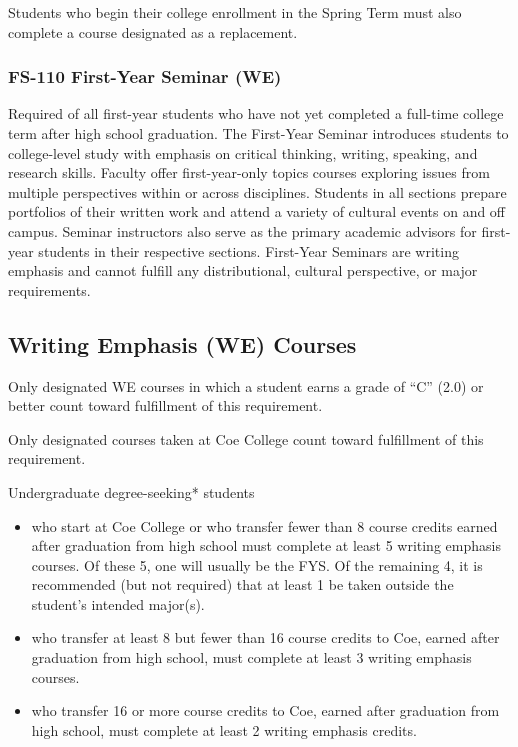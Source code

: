 \documentclass[
  letterpaper,
]{scrbook}
\providecommand{\tightlist}{%
  \setlength{\itemsep}{0pt}\setlength{\parskip}{0pt}}
\begin{document}
Students who begin their college enrollment in the Spring Term must also
complete a course designated as a replacement.

\subsubsection{FS-110 First-Year Seminar
(WE)}\label{fs-110-first-year-seminar-we}

Required of all first-year students who have not yet completed a
full-time college term after high school graduation. The First-Year
Seminar introduces students to college-level study with emphasis on
critical thinking, writing, speaking, and research skills. Faculty offer
first-year-only topics courses exploring issues from multiple
perspectives within or across disciplines. Students in all sections
prepare portfolios of their written work and attend a variety of
cultural events on and off campus. Seminar instructors also serve as the
primary academic advisors for first-year students in their respective
sections. First-Year Seminars are writing emphasis and cannot fulfill
any distributional, cultural perspective, or major requirements.

\subsection{Writing Emphasis (WE)
Courses}\label{writing-emphasis-we-courses}

Only designated WE courses in which a student earns a grade of ``C''
(2.0) or better count toward fulfillment of this requirement.

Only designated courses taken at Coe College count toward fulfillment of
this requirement.

Undergraduate degree-seeking* students

\begin{itemize}
\tightlist
\item
  who start at Coe College or who transfer fewer than 8 course credits
  earned after graduation from high school must complete at least 5
  writing emphasis courses. Of these 5, one will usually be the FYS. Of
  the remaining 4, it is recommended (but not required) that at least 1
  be taken outside the student's intended major(s).
\item
  who transfer at least 8 but fewer than 16 course credits to Coe,
  earned after graduation from high school, must complete at least 3
  writing emphasis courses.
\item
  who transfer 16 or more course credits to Coe, earned after graduation
  from high school, must complete at least 2 writing emphasis credits.
\end{itemize}
\end{document}
